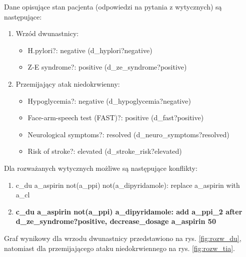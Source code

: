 Dane opisujące stan pacjenta (odpowiedzi na pytania z wytycznych) są następujące:
\begin{enumerate}
\item{Wrzód dwunastnicy:
	\begin{itemize}
	\item{H.pylori?: negative (d\_hyplori?negative)}
	\item{Z-E syndrome?: positive (d\_ze\_syndrome?positive)}
	\end{itemize}
}
\item{Przemijający atak niedokrwienny:
	\begin{itemize}
	\item{Hypoglycemia?: negative (d\_hypoglycemia?negative)}
	\item{Face-arm-speech test (FAST)?: positive (d\_fast?positive)}
	\item{Neurological symptoms?: resolved (d\_neuro\_symptoms?resolved)}
	\item{Risk of stroke?: elevated (d\_stroke\_risk?elevated)}
	\end{itemize}
}
\end{enumerate}
Dla rozważanych wytycznych możliwe są następujące konflikty:
\begin{enumerate}
\item c\_du a\_aspirin not(a\_ppi) not(a\_dipyridamole): replace a\_aspirin with a\_cl
\item \textbf{c\_du a\_aspirin not(a\_ppi) a\_dipyridamole: add a\_ppi\_2 after d\_ze\_synd\-rome?positive, decrease\_dosage a\_aspirin 50}
\end{enumerate}

Graf wynikowy dla wrzodu dwunastnicy przedstawiono na rys. \ref{fig:rozw_du}, natomiast dla przemijającego ataku niedokrwiennego na rys. \ref{fig:rozw_tia}.

